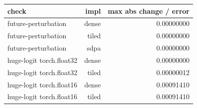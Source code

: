 \begin{tabular}{lrr}
\toprule
check & impl & max abs change / error \\
\midrule
future-perturbation & dense & 0.00000000 \\
future-perturbation & tiled & 0.00000000 \\
future-perturbation & sdpa & 0.00000000 \\
huge-logit torch.float32 & dense & 0.00000000 \\
huge-logit torch.float32 & tiled & 0.00000012 \\
huge-logit torch.float16 & dense & 0.00091410 \\
huge-logit torch.float16 & tiled & 0.00091410 \\
\bottomrule
\end{tabular}
